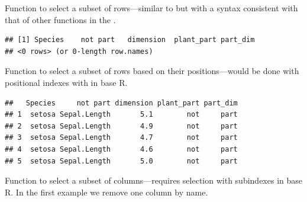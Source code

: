 \documentclass[krantz2]{krantz}\usepackage{knitr}%
\begin{document}
Function  to select a subset of rows---similar to  but with a syntax consistent with that of other functions in the .

\begin{knitrout}\footnotesize
{}\color{fgcolor}\begin{kframe}
\begin{alltt}
 \hlopt{==} \hlstd{)}
\end{alltt}
\begin{verbatim}
## [1] Species    not part   dimension  plant_part part_dim  
## <0 rows> (or 0-length row.names)
\end{verbatim}
\end{kframe}
\end{knitrout}

Function  to select a subset of rows based on their positions---would be done with positional indexes with \code{[ , ]} in base R.

\begin{knitrout}\footnotesize
{}\color{fgcolor}\begin{kframe}
\begin{alltt}
 \hlopt{:}\hlstd{)}
\end{alltt}
\begin{verbatim}
##   Species     not part dimension plant_part part_dim
## 1  setosa Sepal.Length       5.1        not     part
## 2  setosa Sepal.Length       4.9        not     part
## 3  setosa Sepal.Length       4.7        not     part
## 4  setosa Sepal.Length       4.6        not     part
## 5  setosa Sepal.Length       5.0        not     part
\end{verbatim}
\end{kframe}
\end{knitrout}

Function  to select a subset of columns---requires selection with subindexes in base R. In the first example we remove one column by name.
\end{document}
